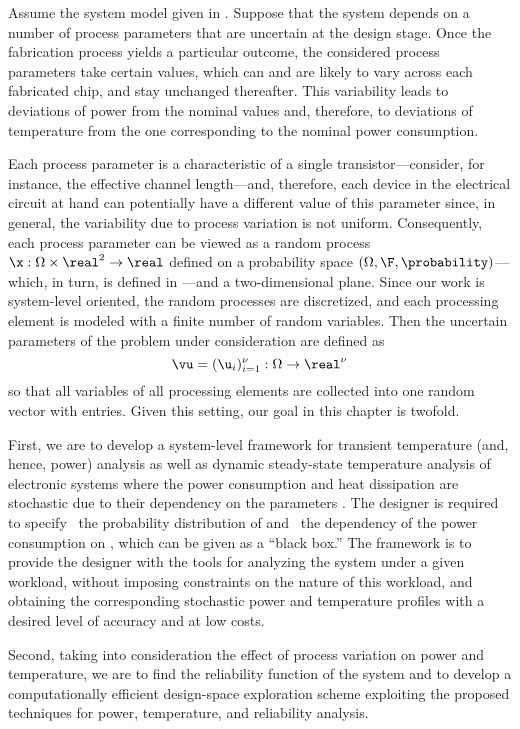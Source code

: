 Assume the system model given in . Suppose that the system
depends on a number of process parameters that are uncertain at the design
stage. Once the fabrication process yields a particular outcome, the considered
process parameters take certain values, which can and are likely to vary across
each fabricated chip, and stay unchanged thereafter. This variability leads to
deviations of power from the nominal values and, therefore, to deviations of
temperature from the one corresponding to the nominal power consumption.

Each process parameter is a characteristic of a single transistor---consider,
for instance, the effective channel length---and, therefore, each device in the
electrical circuit at hand can potentially have a different value of this
parameter since, in general, the variability due to process variation is not
uniform. Consequently, each process parameter can be viewed as a random process
$\x: \Omega \times \real^2 \to \real$ defined on a probability space $(\Omega,
\F, \probability)$---which, in turn, is defined in
---and a two-dimensional plane. Since our work is
system-level oriented, the random processes are discretized, and each processing
element is modeled with a finite number of random variables. Then the uncertain
parameters of the problem under consideration are defined as
\[
  \vu = (\u_i)_{i = 1}^\nu: \Omega \to \real^\nu
\]
so that all variables of all processing elements are collected into one random
vector with \nu entries. Given this setting, our goal in this chapter is
twofold.

First, we are to develop a system-level framework for transient temperature
(and, hence, power) analysis as well as dynamic steady-state temperature
analysis of electronic systems where the power consumption and heat dissipation
are stochastic due to their dependency on the parameters \vu. The designer is
required to specify \one~the probability distribution of \vu and \two~the
dependency of the power consumption on \vu, which can be given as a ``black
box.'' The framework is to provide the designer with the tools for analyzing the
system under a given workload, without imposing constraints on the nature of
this workload, and obtaining the corresponding stochastic power \mp and
temperature \mq profiles with a desired level of accuracy and at low costs.

Second, taking into consideration the effect of process variation on power and
temperature, we are to find the reliability function of the system and to
develop a computationally efficient design-space exploration scheme exploiting
the proposed techniques for power, temperature, and reliability analysis.
